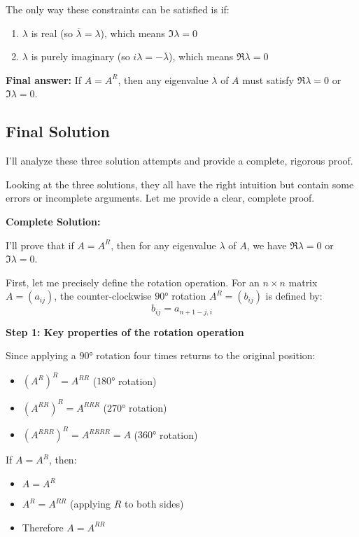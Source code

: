 \documentclass[12pt,a4paper]{article}
\theoremstyle{definition}
\begin{document}
    The only way these constraints can be satisfied is if:
    \begin{enumerate}
        \item $\lambda$ is real (so $\overline{\lambda} = \lambda$), which means $\Im\lambda = 0$
        \item $\lambda$ is purely imaginary (so $i\lambda = -\overline{\lambda}$), which means $\Re\lambda = 0$
    \end{enumerate}

    \textbf{Final answer:} If $A = A^R$, then any eigenvalue $\lambda$ of $A$ must satisfy $\Re\lambda = 0$ or $\Im\lambda = 0$.

\subsection{Final Solution}
        I'll analyze these three solution attempts and provide a complete, rigorous proof.

        Looking at the three solutions, they all have the right intuition but contain some errors or incomplete arguments. Let me provide a clear, complete proof.

        \textbf{Complete Solution:}

        I'll prove that if $A = A^R$, then for any eigenvalue $\lambda$ of $A$, we have $\Re\lambda = 0$ or $\Im\lambda = 0$.

        First, let me precisely define the rotation operation. For an $n \times n$ matrix $A = (a_{ij})$, the counter-clockwise $90°$ rotation $A^R = (b_{ij})$ is defined by:
        $$b_{ij} = a_{n+1-j,i}$$

        \textbf{Step 1: Key properties of the rotation operation}

        Since applying a $90°$ rotation four times returns to the original position:
        \begin{itemize}
            \item $(A^R)^R = A^{RR}$ ($180°$ rotation)
            \item $(A^{RR})^R = A^{RRR}$ ($270°$ rotation)
            \item $(A^{RRR})^R = A^{RRRR} = A$ ($360°$ rotation)
        \end{itemize}

        If $A = A^R$, then:
        \begin{itemize}
            \item $A = A^R$
            \item $A^R = A^{RR}$ (applying $R$ to both sides)
            \item Therefore $A = A^{RR}$
        \end{itemize}
\end{document}
